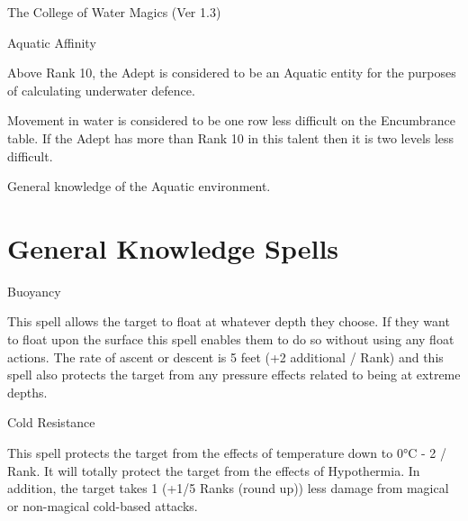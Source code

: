 \begin{Chapter}{The College of Water Magics (Ver 1.3)}
\begin{talent}[T-3]{Aquatic Affinity}
\begin{effects}
\begin{Enumerate}
\item Above Rank 10, the Adept is considered to be an Aquatic entity
  for the purposes of calculating underwater defence.

\item Movement in water is considered to be one row less difficult on
  the Encumbrance table.  If the Adept has more than Rank 10 in this
  talent then it is two levels less difficult.

\item General knowledge of the Aquatic environment. 
\end{Enumerate}
\end{effects}
\end{talent}


\section{General Knowledge Spells}

\begin{spell}[G-1]{Buoyancy}

\begin{effects}
This spell allows the target to float at whatever depth they choose.
If they want to float upon the surface this spell enables them to do
so without using any float actions.  The rate of ascent or descent is
5 feet (+2 additional / Rank) and this spell also protects the target
from any pressure effects related to being at extreme depths.
\end{effects}
\end{spell}

\begin{spell}[G-2]{Cold Resistance}

\begin{effects}
This spell protects the target from the effects of temperature down to
0°C - 2 / Rank.  It will totally protect the target from the effects
of Hypothermia.  In addition, the target takes 1 (+1/5 Ranks (round
up)) less damage from magical or non-magical cold-based attacks.
\end{effects}
\end{spell}


\end{Chapter}
